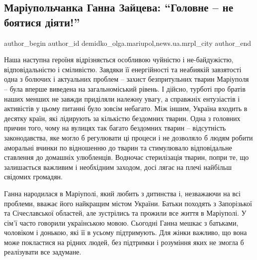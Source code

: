  
 
 
 
 
 
\subsection{Маріупольчанка Ганна Зайцева: \enquote{Головне – не боятися діяти!}}
\label{sec:29_05_2019.stz.news.ua.mrpl_city.1.ganna_zajceva_ne_bojatys_dijaty}
 
\ifcmt
 author_begin
   author_id demidko_olga.mariupol,news.ua.mrpl_city
 author_end
\fi


Наша наступна героїня відрізняється особливою чуйністю і не\hyp{}байдужістю,
відповідальністю і сміливістю. Завдяки її енергійності та неабиякій завзятості
одна з болючих і актуальних проблем – захист безпритульних тварин Маріуполя –
була вперше виведена на загальноміський рівень. І дійсно, турботі про братів
наших менших не завжди приділяли належну увагу, а справжніх ентузіастів і
активістів у цьому питанні було зовсім небагато. Між іншим, Україна входить в
десятку країн, які лідирують за кількістю бездомних тварин. Одна з головних
причин того, чому на вулицях так багато бездомних тварин – відсутність
законодавства, яке могло б регулювати ці процеси і не дозволяло б людям робити
аморальні вчинки по відношенню до тварин та стимулювало відповідальне ставлення
до домашніх улюбленців. Водночас стерилізація тварин, попри те, що залишається
важливим і необхідним заходом, досі лягає на плечі найбільш свідомих громадян.


Ганна народилася в Маріуполі, який любить з дитинства і, незважаючи на всі
проблеми, вважає його найкращим містом України. Батьки походять з Запорізької
та Січеславської областей, але зустрілись та прожили все життя в Маріуполі. У
сім'ї часто говорили українською мовою. Сьогодні Ганна мешкає з батьками,
чоловіком і донькою, які її в усьому підтримують. Для жінки важливо, що вона
може покластися на рідних людей, без підтримки і розуміння яких не змогла б
реалізувати все задумане.

